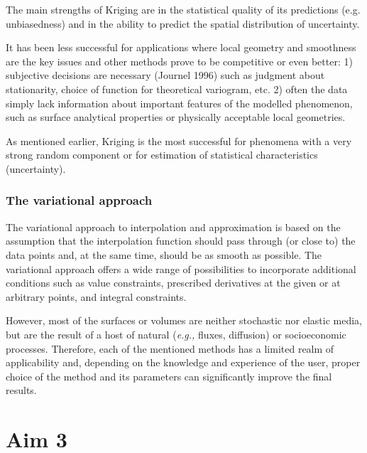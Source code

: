 \documentclass{article}
\begin{document}
The main strengths of Kriging are in the statistical quality of its predictions (e.g. unbiasedness) and in the ability to predict the spatial distribution of uncertainty. 

It has been less successful for applications where local geometry and smoothness are the key issues and other methods prove to be competitive or even better: 1) subjective decisions are necessary (Journel 1996) such as judgment about stationarity, choice of function for theoretical variogram, etc. 2) often the data simply lack information about important features of the modelled phenomenon, such as surface analytical properties or physically acceptable local geometries. 

As mentioned earlier, Kriging is the most successful for phenomena with a very strong random component or for estimation of statistical characteristics (uncertainty).

\subsubsection{The variational approach}
The variational approach to interpolation and approximation is based on the assumption that the interpolation function should pass through (or close to) the data points and, at the same time, should be as smooth as possible. The variational approach offers a wide range of possibilities to incorporate additional conditions such as value constraints, prescribed derivatives at the given or at arbitrary points, and integral constraints.

However, most of the surfaces or volumes are neither stochastic nor elastic media, but are the result of a host of natural (\textit{e.g.,} fluxes, diffusion) or socioeconomic processes. Therefore, each of the mentioned methods has a limited realm of applicability and, depending on the knowledge and experience of the user, proper choice of the method and its parameters can significantly improve the final results. 

\section{Aim 3}
\end{document}
